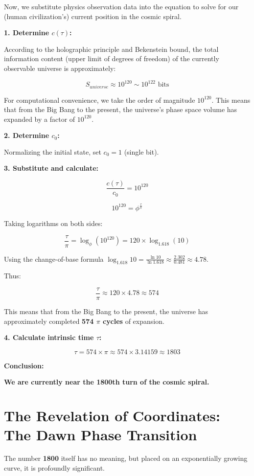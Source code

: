 Now, we substitute physics observation data into the equation to solve for our (human civilization's) current position in the cosmic spiral.

\textbf{1. Determine $c(\tau)$:}

According to the holographic principle and Bekenstein bound, the total information content (upper limit of degrees of freedom) of the currently observable universe is approximately:

$$S_{universe} \approx 10^{120} \sim 10^{122} \text{ bits}$$

For computational convenience, we take the order of magnitude \textbf{$10^{120}$}. This means that from the Big Bang to the present, the universe's phase space volume has expanded by a factor of $10^{120}$.

\textbf{2. Determine $c_0$:}

Normalizing the initial state, set $c_0 = 1$ (single bit).

\textbf{3. Substitute and calculate:}

$$\frac{c(\tau)}{c_0} = 10^{120}$$

$$10^{120} = \phi^{\frac{\tau}{\pi}}$$

Taking logarithms on both sides:

$$\frac{\tau}{\pi} = \log_{\phi} (10^{120}) = 120 \times \log_{1.618} (10)$$

Using the change-of-base formula $\log_{1.618} 10 = \frac{\ln 10}{\ln 1.618} \approx \frac{2.302}{0.481} \approx 4.78$.

Thus:

$$\frac{\tau}{\pi} \approx 120 \times 4.78 \approx 574$$

This means that from the Big Bang to the present, the universe has approximately completed \textbf{574 $\pi$ cycles} of expansion.

\textbf{4. Calculate intrinsic time $\tau$:}

$$\tau = 574 \times \pi \approx 574 \times 3.14159 \approx 1803$$

\textbf{Conclusion:}

\textbf{We are currently near the 1800th turn of the cosmic spiral.}

\section{The Revelation of Coordinates: The Dawn Phase Transition}

The number \textbf{1800} itself has no meaning, but placed on an exponentially growing curve, it is profoundly significant.

